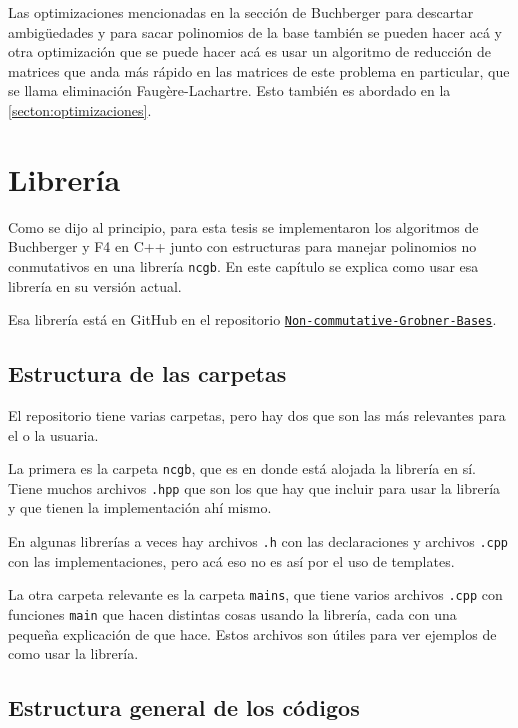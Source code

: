 \documentclass[12pt]{report}
\theoremstyle{customstyle}
\theoremstyle{factstyle}
\begin{document}
Las optimizaciones mencionadas en la sección de Buchberger para descartar ambigüedades y para sacar polinomios de la base también se pueden hacer acá y otra optimización que se puede hacer acá es usar un algoritmo de reducción de matrices que anda más rápido en las matrices de este problema en particular, que se llama eliminación Faugère-Lachartre. Esto también es abordado en la \cref{secton:optimizaciones}.

\chapter{Librería}

Como se dijo al principio, para esta tesis se implementaron los algoritmos de Buchberger y F4 en C++ junto con estructuras para manejar polinomios no conmutativos en una librería \texttt{ncgb}. En este capítulo se explica como usar esa librería en su versión actual. %

Esa librería está en GitHub en el repositorio \href{https://github.com/IvanRenison/Non-commutative-Grobner-Bases}{\texttt{Non-commutative-Grobner-Bases}}.

\section{Estructura de las carpetas}

El repositorio tiene varias carpetas, pero hay dos que son las más relevantes para el o la usuaria.

La primera es la carpeta \texttt{ncgb}, que es en donde está alojada la librería en sí. Tiene muchos archivos \texttt{.hpp} que son los que hay que incluir para usar la librería y que tienen la implementación ahí mismo.

En algunas librerías a veces hay archivos \texttt{.h} con las declaraciones y archivos \texttt{.cpp} con las implementaciones, pero acá eso no es así por el uso de templates.

La otra carpeta relevante es la carpeta \texttt{mains}, que tiene varios archivos \texttt{.cpp} con funciones \texttt{main} que hacen distintas cosas usando la librería, cada con una pequeña explicación de que hace. Estos archivos son útiles para ver ejemplos de como usar la librería.

\section{Estructura general de los códigos} %
\end{document}
